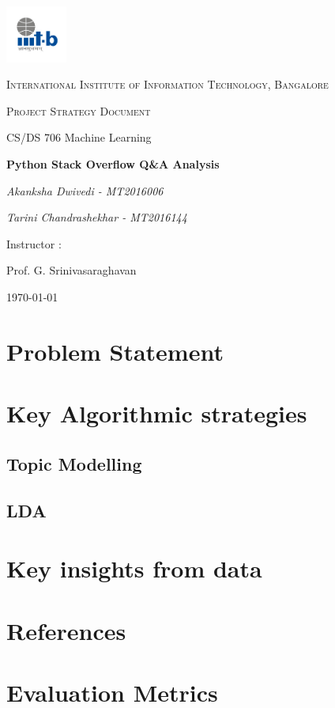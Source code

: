 \documentclass{article}
\begin{document}
\begin{titlepage}
	\centering
	\includegraphics[width=0.15\textwidth]{IIIT-B_logo.jpg}\par\vspace{1cm}
	{\scshape\LARGE International Institute of Information Technology, Bangalore \par}
	\vspace{1cm}
	{\scshape\Large Project Strategy Document\par}
	{\Large  CS/DS 706 Machine Learning\par}
	\vspace{1.5cm}
	{\huge\bfseries Python Stack Overflow Q\&A Analysis\par}
	\vspace{2cm}
	{\Large\itshape Akanksha Dwivedi - MT2016006\par}
	{\Large\itshape Tarini Chandrashekhar - MT2016144\par}
	\vfill
	Instructor : \par
	Prof. G. Srinivasaraghavan

	\vfill

	{\large \today\par}
\end{titlepage}

\newpage

\tableofcontents

\newpage
\justify

\section{Problem Statement}

\section{Key Algorithmic strategies}
\subsection{Topic Modelling}
\subsection{LDA}


\section{Key insights from data}

\section{References}

\section{Evaluation Metrics}
\end{document}
